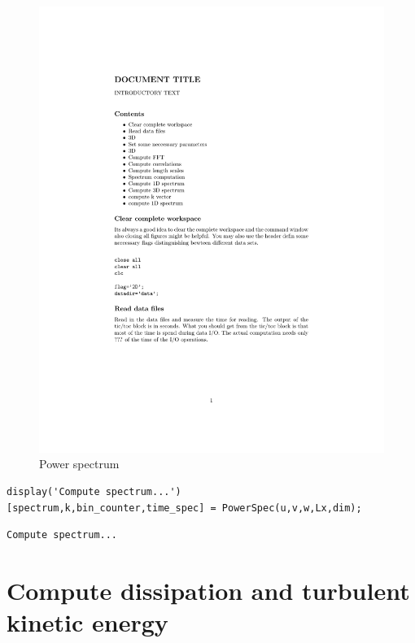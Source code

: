 \documentclass[preprint,12pt,ntfdMod]{elsarticle}
\begin{document}
\begin{par}
\begin{figure}[t!]
      \includegraphics[scale=1]{spectrum}
	  \caption{Power spectrum}
      \label{fig:spectrum}
  \end{figure}

\end{par} \vspace{1em}
\begin{verbatim}
display('Compute spectrum...')
[spectrum,k,bin_counter,time_spec] = PowerSpec(u,v,w,Lx,dim);
\end{verbatim}

        \color{lightgray} \begin{verbatim}Compute spectrum...
\end{verbatim} \color{black}
    \begin{par}



\end{par} \vspace{1em}


\section{Compute dissipation and turbulent kinetic energy}
\end{document}
